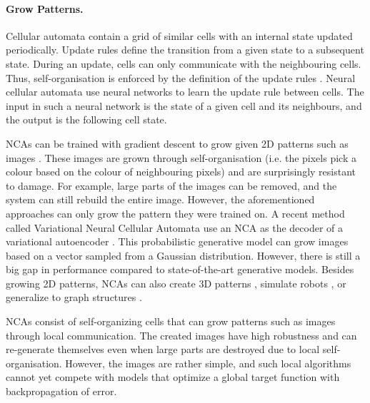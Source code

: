 \paragraph{Grow Patterns.} Cellular automata contain a grid of similar cells with an internal state updated periodically.
Update rules define the transition from a given state to a subsequent state.
During an update, cells can only communicate with the neighbouring cells.
Thus, self-organisation is enforced by the definition of the update rules \cite{wolfram_cellular_1984, vichniac_simulating_1984}.
Neural cellular automata  use neural networks to learn the update rule between cells.
The input in such a neural network is the state of a given cell and its neighbours, and the output is the following cell state.

NCAs can be trained with gradient descent to grow given 2D patterns such as images .
These images are grown through self-organisation (i.e. the pixels pick a colour based on the colour of neighbouring pixels) and are surprisingly resistant to damage.
For example, large parts of the images can be removed, and the system can still rebuild the entire image.
However, the aforementioned approaches can only grow the pattern they were trained on.
A recent method called Variational Neural Cellular Automata  use an NCA as the decoder of a variational autoencoder \cite{kingma_auto-encoding_2022}.
This probabilistic generative model can grow images based on a vector sampled from a Gaussian distribution.
However, there is still a big gap in performance compared to state-of-the-art generative models.
Besides growing 2D patterns, NCAs can also create 3D patterns , simulate robots , or generalize to graph structures .

NCAs consist of self-organizing cells that can grow patterns such as images through local communication. The created images have high robustness and can re-generate themselves even when large parts are destroyed due to local self-organisation. However, the images are rather simple, and such local algorithms cannot yet compete with models that optimize a global target function with backpropagation of error.

